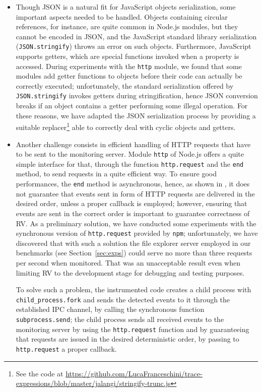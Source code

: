 \begin{itemize}
\item Though JSON is a natural fit for JavaScript objects serialization, some important aspects needed to be handled.
Objects containing circular references, for instance, are quite common in Node.js modules, but they cannot be encoded in JSON, and the JavaScript standard library serialization (\lstinline|JSON.stringify|) throws an error on such objects.
Furthermore, JavaScript supports getters, which are special functions invoked when a property is accessed.
During experiments with the \lstinline{http} module, we found that some modules add getter functions to objects before their code can actually be
correctly executed; unfortunately, the standard serialization offered by \lstinline|JSON.stringify| invokes getters during stringification, hence
JSON conversion  breaks if an object contains a getter performing some illegal operation.
For these reasons, we have  adapted the JSON serialization process by providing a suitable replacer\footnote{See the code at \url{https://github.com/LucaFranceschini/trace-expressions/blob/master/jalangi/stringify-trunc.js}} able to correctly deal
with cyclic objects and getters.

\item Another challenge consists in efficient handling of HTTP requests that have to be sent to the
  monitoring server. Module \lstinline{http} of Node.js offers a quite simple interface for that, through the  function
  \lstinline{http.request} and the \lstinline{end} method, to send requests in a quite efficient way. To ensure good performances, the \lstinline{end} method is asynchronous, hence, as shown in , it does not guarantee that events sent in form of HTTP requests are delivered in the
  desired order, unless a proper callback is employed; however, ensuring that events are sent in the correct order is important to guarantee correctness of RV. As a preliminary solution, we have conducted some experiments with the
  synchronous version of \lstinline{http.request} provided by \lstinline{npm}; unfortunately, we have discovered that with such a solution
  the file explorer server employed in our benchmarks (see Section~\ref{sec:exps}) could serve no more than
  three requests per second when monitored. That was an unacceptable result even when limiting RV to the development stage
  for debugging and testing purposes.

  To solve such a problem, the instrumented code creates a child process with \lstinline{child_process.fork} and
  sends the detected events to it through the established IPC channel, by calling the synchronous function \lstinline{subprocess.send};
  the child process sends all received events to the monitoring server by using the \lstinline{http.request} function and by guaranteeing
  that requests are issued in the desired deterministic order, by passing to \lstinline{http.request} a proper callback.
\end{itemize}

